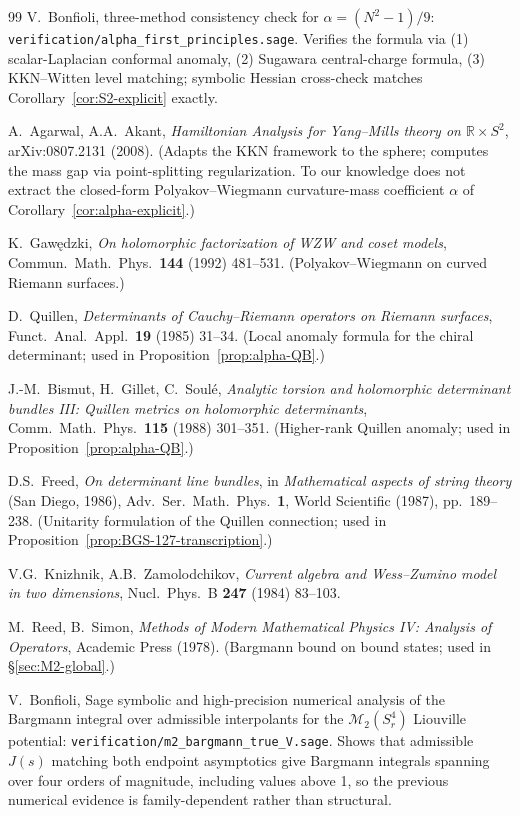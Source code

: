 \documentclass[11pt,letterpaper]{article}
\theoremstyle{definition}
\newcommand{\bbR}{\mathbb{R}}
\newcommand{\cM}{\mathcal{M}}
\begin{document}
\begin{thebibliography}{99}
 V.\ Bonfioli, three-method consistency check for $\alpha = (N^2-1)/9$: \texttt{verification/alpha\_first\_principles.sage}. Verifies the formula via (1) scalar-Laplacian conformal anomaly, (2) Sugawara central-charge formula, (3) KKN--Witten level matching; symbolic Hessian cross-check matches Corollary~\ref{cor:S2-explicit} exactly.

 A.\ Agarwal, A.A.\ Akant, \emph{Hamiltonian Analysis for Yang--Mills theory on $\bbR\times S^2$}, arXiv:0807.2131 (2008). (Adapts the KKN framework to the sphere; computes the mass gap via point-splitting regularization. To our knowledge does not extract the closed-form Polyakov--Wiegmann curvature-mass coefficient $\alpha$ of Corollary~\ref{cor:alpha-explicit}.)

 K.\ Gawędzki, \emph{On holomorphic factorization of WZW and coset models}, Commun.\ Math.\ Phys.\ \textbf{144} (1992) 481--531. (Polyakov--Wiegmann on curved Riemann surfaces.)

 D.\ Quillen, \emph{Determinants of Cauchy--Riemann operators on Riemann surfaces}, Funct.\ Anal.\ Appl.\ \textbf{19} (1985) 31--34. (Local anomaly formula for the chiral determinant; used in Proposition~\ref{prop:alpha-QB}.)

 J.-M.\ Bismut, H.\ Gillet, C.\ Soul\'e, \emph{Analytic torsion and holomorphic determinant bundles III: Quillen metrics on holomorphic determinants}, Comm.\ Math.\ Phys.\ \textbf{115} (1988) 301--351. (Higher-rank Quillen anomaly; used in Proposition~\ref{prop:alpha-QB}.)

 D.S.\ Freed, \emph{On determinant line bundles}, in \emph{Mathematical aspects of string theory} (San Diego, 1986), Adv.\ Ser.\ Math.\ Phys.\ \textbf{1}, World Scientific (1987), pp.\ 189--238. (Unitarity formulation of the Quillen connection; used in Proposition~\ref{prop:BGS-127-transcription}.)

 V.G.\ Knizhnik, A.B.\ Zamolodchikov, \emph{Current algebra and Wess--Zumino model in two dimensions}, Nucl.\ Phys.\ B \textbf{247} (1984) 83--103.

 M.\ Reed, B.\ Simon, \emph{Methods of Modern Mathematical Physics IV: Analysis of Operators}, Academic Press (1978). (Bargmann bound on bound states; used in \S\ref{sec:M2-global}.)

 V.\ Bonfioli, Sage symbolic and high-precision numerical analysis of the Bargmann integral over admissible interpolants for the $\cM_2(S^4_r)$ Liouville potential: \texttt{verification/m2\_bargmann\_true\_V.sage}. Shows that admissible $J(s)$ matching both endpoint asymptotics give Bargmann integrals spanning over four orders of magnitude, including values above 1, so the previous numerical evidence is family-dependent rather than structural.


\end{thebibliography}
\end{document}
